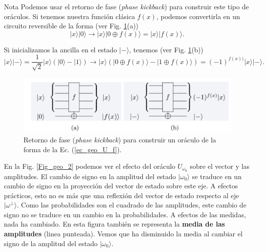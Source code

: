 \documentclass[a4paper,11pt]{book} %
\numberwithin{equation}{chapter}
\def\lp{\left(}
\def\rp{\right)}
\begin{document}
	\begin{mybox_blue}{Nota}
	Podemos usar el retorno de fase (\textit{phase kickback}) para construir este tipo de oráculos. 
	Si tenemos nuestra función clásica $f(x)$,   podemos convertirla en un circuito reversible de la 
	forma (ver Fig. \ref{Fig_geo_phase_kick}(a))
	\begin{equation*}
	|x \rangle |0 \rangle \rightarrow |x \rangle | 0 \oplus f(x) \rangle  = |x \rangle | f(x) \rangle .
	\end{equation*}

	Si inicializamos la ancilla en el estado $| -\rangle$, tenemos (ver Fig. \ref{Fig_geo_phase_kick}(b))
	\begin{equation*}
	|x \rangle |- \rangle = \frac{1}{\sqrt{2}} |x \rangle \lp | 0 \rangle - | 1 \rangle \rp 
	\rightarrow 
	|x \rangle \lp | 0 \oplus f(x) \rangle - | 1 \oplus f(x) \rangle  \rp = (-1)^{f(x))} |x \rangle |- \rangle .
	\end{equation*} \vspace{-0.8cm}

	\begin{figure}[H]
	\centering 
	\includegraphics[width=0.6\linewidth]{Figuras/Fig_subfig_geo_phase_kick.png}
	\caption{Retorno de fase (\textit{phase kickback}) para construir un oráculo de la forma de la 	Ec. (\ref{ec_geo_U_f}). }
	\label{Fig_geo_phase_kick}
	\end{figure}

	\end{mybox_blue}

En la Fig. \ref{Fig_geo_2} podemos ver el efecto del oráculo $U_{\omega_0}$ sobre el vector y las amplitudes. El cambio de signo en la amplitud del estado $| \omega_0 \rangle$ se traduce en un cambio de signo en la proyección del vector de estado sobre este eje. A efectos prácticos, esto no es más que una reflexión del vector de estado respecto al eje $| \omega^{\perp} \rangle$. Como las probabilidades son el cuadrado de las amplitudes, este cambio de signo no se traduce en un cambio en la probabilidades. A efectos de las medidas, nada ha cambiado. En esta figura también se representa la \textbf{media de las amplitudes} (linea punteada). Vemos que ha disminuido la media al cambiar el signo de la amplitud del estado $| \omega_0 \rangle$. 
\end{document}
